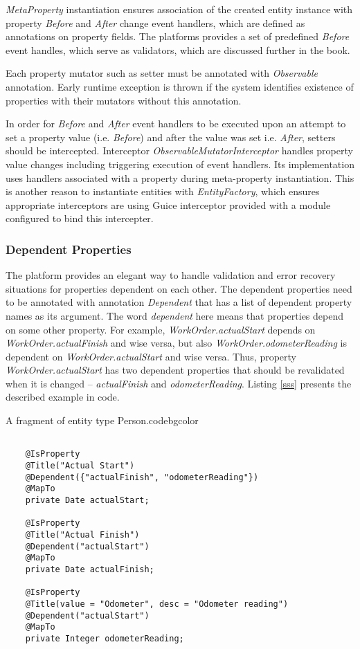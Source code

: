   \emph{MetaProperty} instantiation ensures association of the created entity instance with property \emph{Before} and \emph{After} change event handlers, which are defined as annotations on property fields. 
  The platforms provides a set of predefined \emph{Before} event handles, which serve as validators, which are discussed further in the book. 
  
  Each property mutator such as setter must be annotated with \emph{Observable} annotation. 
  Early runtime exception is thrown if the system identifies existence of properties with their mutators without this annotation.

  In order for \emph{Before} and \emph{After} event handlers to be executed upon an attempt to set a property value (i.e. \emph{Before}) and after the value was set {i.e. \emph{After}}, setters should be intercepted. 
  Interceptor \emph{ObservableMutatorInterceptor} handles property value changes including triggering execution of event handlers. 
  Its implementation uses handlers associated with a property during meta-property instantiation. 
  This is another reason to instantiate entities with \emph{EntityFactory}, which ensures appropriate interceptors are using Guice interceptor provided with a module configured to bind this intercepter.

\subsubsection{Dependent Properties}

  The platform provides an elegant way to handle validation and error recovery situations for properties dependent on each other. 
  The dependent properties need to be annotated with annotation \emph{Dependent} that has a list of dependent property names as its argument. 
  The word \emph{dependent} here means that properties depend on some other property. 
  For example, \emph{WorkOrder.actualStart} depends on \emph{WorkOrder.actualFinish} and wise versa, but also \emph{WorkOrder.odometerReading} is dependent on \emph{WorkOrder.actualStart} and wise versa. 
  Thus, property \emph{WorkOrder.actualStart} has two dependent properties that should be revalidated when it is changed -- \emph{actualFinish} and \emph{odometerReading}.
  Listing \ref{sss} presents the described example in code.

  \begin{code}{A fragment of entity type Person.}{\label{lst:Person}}{codebgcolor}
    \begin{lstlisting}

    @IsProperty
    @Title("Actual Start")
    @Dependent({"actualFinish", "odometerReading"})
    @MapTo
    private Date actualStart;

    @IsProperty
    @Title("Actual Finish")
    @Dependent("actualStart")
    @MapTo
    private Date actualFinish;

    @IsProperty
    @Title(value = "Odometer", desc = "Odometer reading")
    @Dependent("actualStart")
    @MapTo
    private Integer odometerReading;
    \end{lstlisting}
  \end{code}


